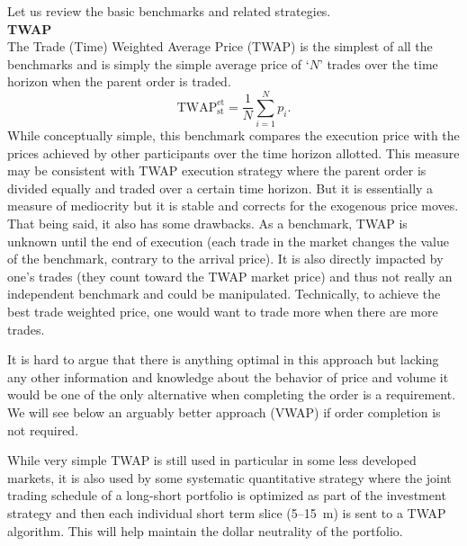 Let us review the basic benchmarks and related strategies. \\

\noindent\textbf{TWAP} \\


The Trade (Time) Weighted Average Price (TWAP) is the simplest of all the benchmarks and is simply the simple average price of `$N$' trades over the time horizon when the parent order is traded.
        \begin{equation}
        \text{TWAP}_{\text{st}} ^{\text{et}}= \frac{1}{N}\sum_{i=1}^N{p_i}.
        \end{equation}
While conceptually simple, this benchmark compares the execution price with the prices achieved by other participants over the time horizon allotted. This measure may be consistent with TWAP execution strategy where the parent order is divided equally and traded over a certain time horizon. But it is essentially a measure of mediocrity but it is stable and corrects for the exogenous price moves. That being said, it also has some drawbacks. As a benchmark, TWAP is unknown until the end of execution (each trade in the market changes the value of the benchmark, contrary to the arrival price). It is also directly impacted by one's trades (they count toward the TWAP market price) and thus not really an independent benchmark and could be manipulated. Technically, to achieve the best trade weighted price, one would want to trade more when there are more trades. 


It is hard to argue that there is anything optimal in this approach but lacking any other information and knowledge about the behavior of price and volume it would be one of the only alternative when completing the order is a requirement. We will see below an arguably better approach (VWAP) if order completion is not required. 


While very simple TWAP is still used in particular in some less developed markets, it is also used by some systematic quantitative strategy where the joint trading schedule of a long-short portfolio is optimized as part of the investment strategy and then each individual short term slice (5--15~m) is sent to a TWAP algorithm. This will help maintain the dollar neutrality of the portfolio. \\

